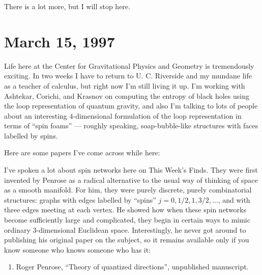 \documentclass{article}
\def\tightlist{}
\renewcommand{\texttt}[1]{%
  \begingroup
  \ttfamily
  \begingroup\lccode`~=`/\lowercase{\endgroup\def~}{/\discretionary{}{}{}}%
  \begingroup\lccode`~=`[\lowercase{\endgroup\def~}{[\discretionary{}{}{}}%
  \begingroup\lccode`~=`.\lowercase{\endgroup\def~}{.\discretionary{}{}{}}%
  \catcode`/=\active\catcode`[=\active\catcode`.=\active
  \scantokens{#1\noexpand}%
  \endgroup
}
\begin{document}
There is a lot more, but I will stop here.



\hypertarget{week99}{%
\section{March 15, 1997}\label{week99}}

Life here at the Center for Gravitational Physics and Geometry is
tremendously exciting. In two weeks I have to return to U. C. Riverside
and my mundane life as a teacher of calculus, but right now I'm still
living it up. I'm working with Ashtekar, Corichi, and Krasnov on
computing the entropy of black holes using the loop representation of
quantum gravity, and also I'm talking to lots of people about an
interesting \(4\)-dimensional formulation of the loop representation in
terms of ``spin foams'' --- roughly speaking, soap-bubble-like
structures with faces labelled by spins.

Here are some papers I've come across while here:


I've spoken a lot about spin networks here on This Week's Finds. They
were first invented by Penrose as a radical alternative to the usual way
of thinking of space as a smooth manifold. For him, they were purely
discrete, purely combinatorial structures: graphs with edges labelled by
``spins'' \(j = 0, 1/2, 1, 3/2, \ldots\), and with three edges meeting
at each vertex. He showed how when these spin networks become
sufficiently large and complicated, they begin in certain ways to mimic
ordinary 3-dimensional Euclidean space. Interestingly, he never got
around to publishing his original paper on the subject, so it remains
available only if you know someone who knows someone who has it:

\begin{enumerate}
\def\labelenumi{\arabic{enumi})}
\setcounter{enumi}{1}
\tightlist
\item
  Roger Penrose, ``Theory of quantized directions'', unpublished
  manuscript.
\end{enumerate}
\end{document}
